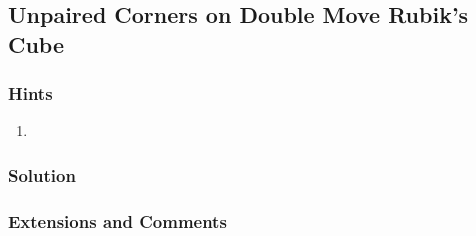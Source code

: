 \subsection{Unpaired Corners on Double Move Rubik's Cube}

\subsubsection{Hints}

\begin{enumerate}
    \item 
\end{enumerate}

\subsubsection{Solution}



\subsubsection{Extensions and Comments}